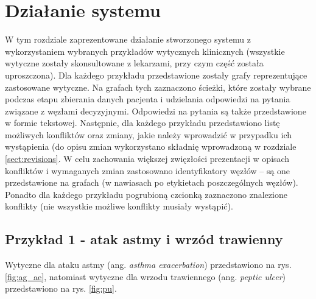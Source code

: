 \chapter{Działanie systemu}
W tym rozdziale zaprezentowane działanie stworzonego systemu z wykorzystaniem wybranych przykładów wytycznych klinicznych (wszystkie wytyczne zostały skonsultowane z lekarzami, przy czym część została uproszczona). Dla każdego przykładu przedstawione zostały grafy reprezentujące zastosowane wytyczne. Na grafach tych zaznaczono ścieżki, które zostały wybrane podczas etapu zbierania danych pacjenta i udzielania odpowiedzi na pytania związane z węzłami decyzyjnymi. Odpowiedzi na pytania są także przedstawione w formie tekstowej. Następnie, dla każdego przykładu przedstawiono listę możliwych konfliktów oraz zmiany, jakie należy wprowadzić w przypadku ich wystąpienia (do opisu zmian wykorzystano składnię wprowadzoną w rozdziale \ref{sect:revisions}. W celu zachowania większej zwięzłości prezentacji w opisach konfliktów i wymaganych zmian zastosowano identyfikatory węzłów -- są one przedstawione na grafach (w nawiasach po etykietach poszczególnych węzłów). Ponadto dla każdego przykładu pogrubioną czcionką zaznaczono znalezione konflikty (nie wszystkie możliwe konflikty musiały wystąpić).

\section{Przykład 1 - atak astmy i wrzód trawienny}
Wytyczne dla ataku astmy (ang. \textit{asthma exacerbation}) przedstawiono na rys. \ref{fig:ag_ae}, natomiast wytyczne dla wrzodu trawiennego (ang. \textit{peptic ulcer}) przedstawiono na rys. \ref{fig:pu}.

